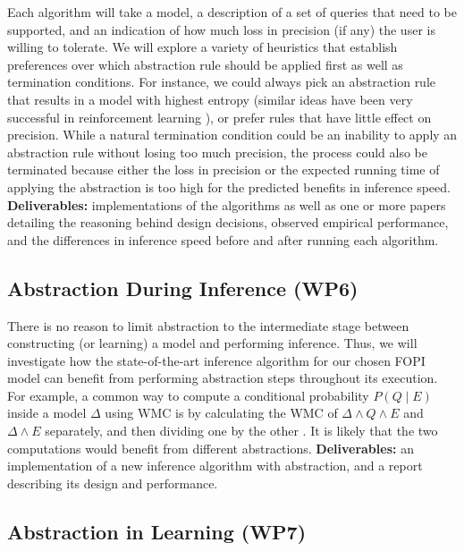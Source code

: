 \documentclass[11pt,english,twocolumn]{article}
\begin{document}
Each algorithm will take a model, a description of a set of queries that need to
be supported, and an indication of how much loss in precision (if any) the user
is willing to tolerate. We will explore a variety of heuristics that establish
preferences over which abstraction rule should be applied first as well as
termination conditions. For instance, we could always pick an abstraction rule
that results in a model with highest entropy (similar ideas have been very
successful in reinforcement learning \cite{DBLP:conf/aaai/ZiebartMBD08}), or
prefer rules that have little effect on precision. While a natural termination
condition could be an inability to apply an abstraction rule without losing too
much precision, the process could also be terminated because either the loss in
precision or the expected running time of applying the abstraction is too high
for the predicted benefits in inference speed. \textbf{Deliverables:}
implementations of the algorithms as well as one or more papers detailing the
reasoning behind design decisions, observed empirical performance, and the
differences in inference speed before and after running each algorithm.

\subsection*{Abstraction During Inference (WP6)}

There is no reason to limit abstraction to the intermediate stage between
constructing (or learning) a model and performing inference. Thus, we will
investigate how the state-of-the-art inference algorithm for our chosen FOPI
model can benefit from performing abstraction steps throughout its execution.
For example, a common way to compute a conditional probability $P(Q \mid E)$
inside a model $\Delta$ using WMC is by calculating the WMC of $\Delta \land Q
\land E$ and $\Delta \land E$ separately, and then dividing one by the other
\cite{DBLP:journals/ai/ChaviraD08}. It is likely that the two computations would
benefit from different abstractions. \textbf{Deliverables:} an implementation of a
new inference algorithm with abstraction, and a report describing its design and
performance.

\subsection*{Abstraction in Learning (WP7)}
\end{document}
